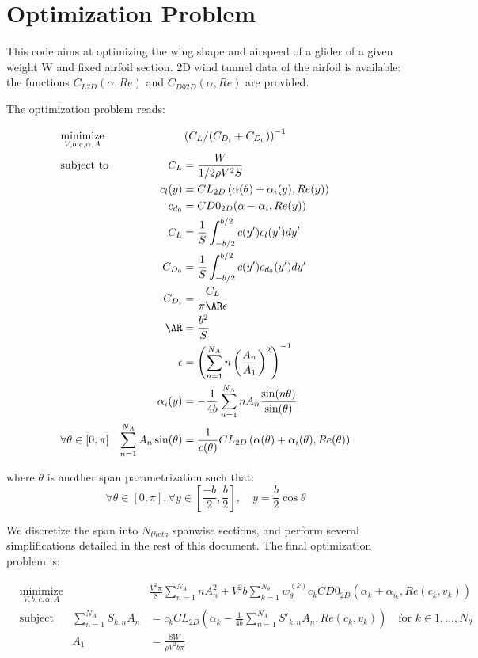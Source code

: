 \documentclass[letterpaper,12pt]{article}
\begin{document}
\section{Optimization Problem}

This code aims at optimizing the wing shape and airspeed of a glider of a given weight W and fixed airfoil section.
2D wind tunnel data of the airfoil is available: the functions
$C_{L2D}(\alpha, Re)$ and 
$C_{D02D}(\alpha, Re)$ are provided.

The optimization problem reads:

\begin{align*}
	& \underset{V, b, c, \alpha, A}{\text{minimize}}
	& & \left( C_L / (C_{D_i} + C_{D_0})\right)^{-1} \nonumber \\
	& \text{subject to} 
	& C_L &= \frac{W}{1/2 \rho V^2 S} \\
	& & c_l(y) &= CL_{2D} \left( \alpha(\theta) + \alpha_i(y), Re(y)\right) \\
	& & c_{d_0} &= CD0_{2D}(\alpha - \alpha_i, Re(y)) \\
	& & C_L &= \frac 1 S \int_{-b/2}^{b/2} c(y') c_l(y') dy'\\
	& & C_{D_0} &= \frac 1 S \int_{-b/2}^{b/2} c(y') c_{d_0}(y') dy'\\
	& & C_{D_i} & = \frac{C_L}{\pi \AR \epsilon} \\
	& & \AR &= \frac{b^2}{S} \\
	& & \epsilon &= \left(\sum_{n=1}^{N_A} n \left(\frac{A_n}{A_1}\right)^2 \right)^{-1} \\
	& & \alpha_i(y) &= -\frac 1 {4b} \sum_{n=1}^{N_A} n A_n\frac{\sin(n\theta)}{\sin(\theta)} \\
	& \forall \theta \in [0, \pi] & \sum_{n=1}^{N_A} A_n \sin(\theta) &= \frac{1}{c(\theta)} CL_{2D} \left( \alpha(\theta) + \alpha_i(\theta), Re(\theta)\right) \\
\end{align*}

where $\theta$ is another span parametrization such that:
$$\forall \theta \in [0,\pi], \forall y \in [\frac {-b} 2, \frac b 2], \quad y = \frac b 2 \cos\theta$$

We discretize the span into $N_{theta}$ spanwise sections, and perform several simplifications detailed in the rest of this document.
The final optimization problem is:

\begin{align*}
	& \underset{V, b, c, \alpha, A}{\text{minimize}}
	& & \frac{V^2 \pi}{8}\sum_{n=1}^{N_A} n A_{n}^2 +
	  V^2 b  \sum_{k=1}^{N_{\theta}} w_{\theta}^{(k)} c_k CD0_{2D}\left( 
		\alpha_k +\alpha_{i_k}, Re(c_k, v_k)
		\right) \\
	& \text{subject to}
	&  \sum_{n=1}^{N_{A}} S_{k,n} A_n &=  c_kCL_{2D} \left( \alpha_k - \frac {1}{4b} 
		\sum_{n=1}^{N_{A}}S'_{k,n}A_n , Re(c_k, v_k)\right) \quad \text{for } k \in 1,\dots, N_{\theta} \\
	& &  A_1 &= \frac{8W}{\rho V^2 b \pi}\\
\end{align*}
\end{document}
